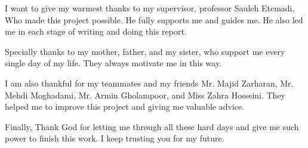 
I want to give my warmest thanks to my supervisor, professor Sauleh Etemadi, Who made this project possible. He fully supports me and guides me. He also led me in each stage of writing and doing this report.  

Specially thanks to my mother, father, and my sister, who support me every single day of my life. They always motivate me in this way.

I am also thankful for my teammates and my friends Mr. Majid Zarharan, Mr. Mehdi Moghadami, Mr. Armin Gholampoor, and Miss Zahra Hosseini. They helped me to improve this project and giving me valuable advice. 

Finally, Thank God for letting me through all these hard days and give me such power to finish this work. I keep trusting you for my future.  	